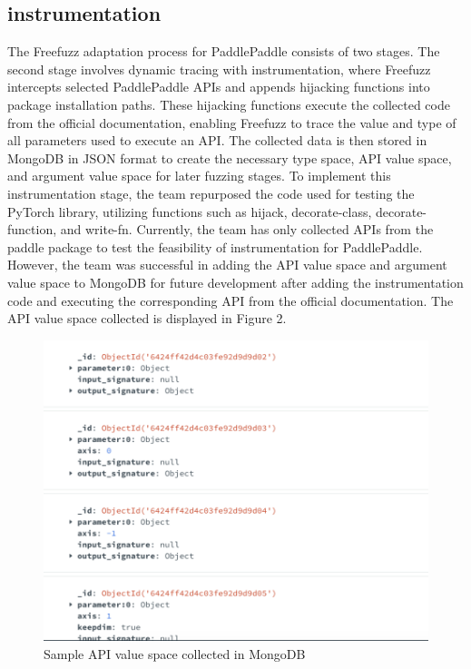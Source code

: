\documentclass[sigconf]{acmart}
\begin{document}
\subsection{instrumentation}
The Freefuzz adaptation process for PaddlePaddle consists of two stages. The second stage involves dynamic tracing with instrumentation, where Freefuzz intercepts selected PaddlePaddle APIs and appends hijacking functions into package installation paths. These hijacking functions execute the collected code from the official documentation, enabling Freefuzz to trace the value and type of all parameters used to execute an API. The collected data is then stored in MongoDB in JSON format to create the necessary type space, API value space, and argument value space for later fuzzing stages.
To implement this instrumentation stage, the team repurposed the code used for testing the PyTorch library, 
utilizing functions such as hijack, decorate-class, decorate-function, and write-fn.
 Currently, the team has only collected APIs from the paddle package to test the feasibility of instrumentation for PaddlePaddle. 
 However, the team was successful in adding the API value space and argument value space to MongoDB for future development after 
 adding the instrumentation code and executing the corresponding API from the official documentation. 
 The API value space collected is displayed in Figure 2.
 \begin{figure}[h]
  \centering
  \includegraphics[width=\linewidth]{2.png}
  \caption{Sample API value space collected in MongoDB}
\end{figure}
\end{document}

